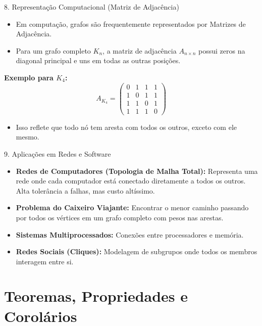 \documentclass[9pt]{beamer}
\begin{document}
    \begin{frame}{8. Representação Computacional (Matriz de Adjacência)}
        \begin{itemize}
            \item Em computação, grafos são frequentemente representados por Matrizes de Adjacência.
            \item Para um grafo completo $K_n$, a matriz de adjacência $A_{n \times n}$ possui zeros na diagonal principal e uns em todas as outras posições.
        \end{itemize}
        \vspace{0.3cm}
        \textbf{Exemplo para $K_4$:}
        \[
        A_{K_4} = \begin{pmatrix}
        0 & 1 & 1 & 1 \\
        1 & 0 & 1 & 1 \\
        1 & 1 & 0 & 1 \\
        1 & 1 & 1 & 0 
        \end{pmatrix}
        \]
        \begin{itemize}
            \item Isso reflete que todo nó tem aresta com todos os outros, exceto com ele mesmo.
        \end{itemize}
    \end{frame}

    \begin{frame}{9. Aplicações em Redes e Software}
        \begin{itemize}
            \item \textbf{Redes de Computadores (Topologia de Malha Total):} Representa uma rede onde cada computador está conectado diretamente a todos os outros. Alta tolerância a falhas, mas custo altíssimo.
            \item \textbf{Problema do Caixeiro Viajante:} Encontrar o menor caminho passando por todos os vértices em um grafo completo com pesos nas arestas.
            \item \textbf{Sistemas Multiprocessados:} Conexões entre processadores e memória.
            \item \textbf{Redes Sociais (Cliques):} Modelagem de subgrupos onde todos os membros interagem entre si.
        \end{itemize}
    \end{frame}

    \section{Teoremas, Propriedades e Corolários}
\end{document}

